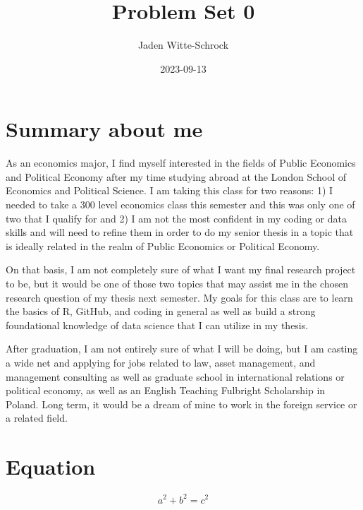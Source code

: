 \documentclass{article}
\title{Problem Set 0}
\author{Jaden Witte-Schrock}
\date{2023-09-13}
\begin{document}
\maketitle

\section{Summary about me}
As an economics major, I find myself interested in the fields of Public Economics and Political Economy after my time studying abroad at the London School of Economics and Political Science. I am taking this class for two reasons: 
1) I needed to take a 300 level economics class this semester and this was only one of two that I qualify for and 
2) I am not the most confident in my coding or data skills and will need to refine them in order to do my senior thesis in a topic that is ideally related in the realm of Public Economics or Political Economy. 

On that basis, I am not completely sure of what I want my final research project to be, but it would be one of those two topics that may assist me in the chosen research question of my thesis next semester. My goals for this class are to learn the basics of R, GitHub, and coding in general as well as build a strong foundational knowledge of data science that I can utilize in my thesis. 

After graduation, I am not entirely sure of what I will be doing, but I am casting a wide net and applying for jobs related to law, asset management, and management consulting as well as graduate school in international relations or political economy, as well as an English Teaching Fulbright Scholarship in Poland. Long term, it would be a dream of mine to work in the foreign service or a related field. 

\section{Equation}
\[ a^2 + b^2 = c^2 \]
\end{document}
